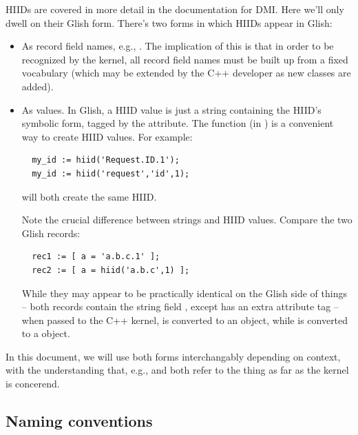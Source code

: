 \documentclass[10pt,twoside]{book}
\begin{document}
  HIIDs are covered in more detail in the documentation for DMI. Here we'll
  only dwell on their Glish form. There's two forms in which HIIDs appear in
  Glish:
  
  \begin{itemize}
  
  \item As record field names, e.g., . The implication of
  this is that in order to be recognized by the kernel, all record field names
  must be built up from a fixed vocabulary (which may be extended by the
  C++ developer as new classes are added).

  \item As values. In Glish, a HIID value is just a string containing the
  HIID's symbolic form, tagged by the  attribute. The
   function (in ) is a convenient way to create HIID
  values. For example:

  \begin{verbatim}
  my_id := hiid('Request.ID.1');
  my_id := hiid('request','id',1);
  \end{verbatim}
  
  will both create the same HIID. 
  
  Note the crucial difference between strings and HIID values. Compare the two
  Glish records:

  \begin{verbatim}
  rec1 := [ a = 'a.b.c.1' ];
  rec2 := [ a = hiid('a.b.c',1) ];
  \end{verbatim}
  
  While they may appear to be practically identical on the Glish side of things
  -- both records contain the string field , except  has an
  extra attribute tag -- when passed to the C++ kernel,  is
  converted to an  object, while  is converted to a
   object.
  
  \end{itemize}

  In this document, we will use both forms interchangably depending on context,
  with the understanding that, e.g.,  and 
  both refer to the thing as far as the kernel is concerend.

\subsection{Naming conventions}
\end{document}
